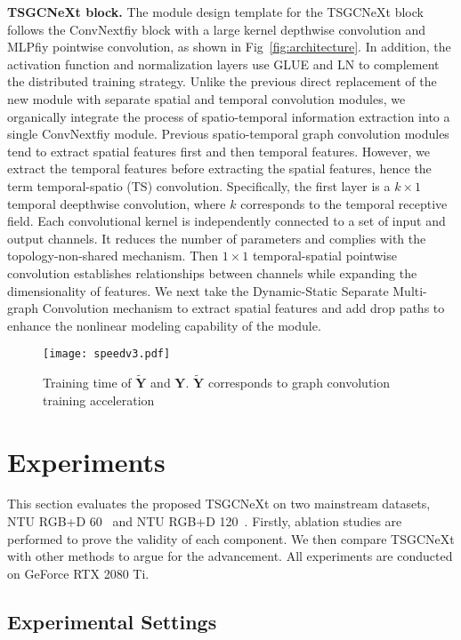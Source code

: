 \documentclass[10pt,twocolumn,letterpaper]{article}
\begin{document}
\noindent\textbf{TSGCNeXt block.} The module design template for the TSGCNeXt block follows the ConvNextfiy block with a large kernel depthwise convolution and MLPfiy pointwise convolution, as shown in Fig~\ref{fig:architecture}. In addition, the activation function and normalization layers use GLUE and LN to complement the distributed training strategy. Unlike the previous direct replacement of the new module with separate spatial and temporal convolution modules, we organically integrate the process of spatio-temporal information extraction into a single ConvNextfiy module. Previous spatio-temporal graph convolution modules tend to extract spatial features first and then temporal features. However, we extract the temporal features before extracting the spatial features, hence the term temporal-spatio (TS) convolution.
Specifically, the first layer is a $k\times 1$ temporal deepthwise convolution, where $k$ corresponds to the temporal receptive field. Each convolutional kernel is independently connected to a set of input and output channels. It reduces the number of parameters and complies with the topology-non-shared mechanism. Then $1\times 1$ temporal-spatial pointwise convolution establishes relationships between channels while expanding the dimensionality of features. We next take the Dynamic-Static Separate Multi-graph Convolution mechanism to extract spatial features and add drop paths to enhance the nonlinear modeling capability of the module.
\begin{figure}\centering
    \texttt{[image: speedv3.pdf]}
    \caption{Training time of $\mathbf{\tilde{Y}}$ and $\mathbf{Y}$. $\mathbf{\tilde{Y}}$ corresponds to graph convolution training acceleration}
    \label{fig:speed}
    \vspace{-1em}
\end{figure}
\section{Experiments}
This section evaluates the proposed TSGCNeXt on two mainstream datasets, NTU RGB+D 60~\cite{shahroudy2016ntu} and NTU RGB+D 120~\cite{liu2019ntu}. Firstly, ablation studies are performed to prove the validity of each component. We then compare TSGCNeXt with other methods to argue for the advancement. All experiments are conducted on GeForce RTX 2080 Ti.

\subsection{Experimental Settings}
\label{sec:exp-setting}
\end{document}
